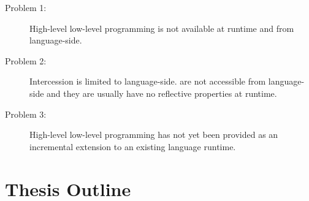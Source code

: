 \begin{description}
	\item[Problem 1:] High-level low-level programming is not available at runtime and from language-side.
	
	\item[Problem 2:] Intercession is limited to language-side.
	\VMs are not accessible from language-side and they are usually have no reflective properties at runtime.
	
	\item[Problem 3:] High-level low-level programming has not yet been provided as an incremental extension to an existing language runtime.
\end{description}

\section{Thesis Outline}

